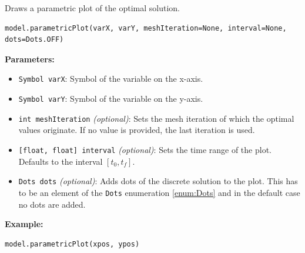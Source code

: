 \documentclass[12pt]{article}
\begin{document}
\begin{mdframed}[backgroundcolor=gray!10, roundcorner=10pt,
		linewidth=1pt]
	
	Draws a parametric plot of the optimal solution.
 
	\begin{lstlisting}
model.parametricPlot(varX, varY, meshIteration=None, interval=None, dots=Dots.OFF)
		\end{lstlisting}
	\label{parametricPlot}
	\textbf{Parameters:}
	\begin{itemize}
		\item \texttt{Symbol varX}: Symbol of the variable on the x-axis.
		
		\item \texttt{Symbol varY}: Symbol of the variable on the y-axis.
		
		\item \texttt{int meshIteration} \emph{(optional)}: Sets the mesh iteration of which the optimal values originate. If no value is provided, the last iteration is used.

		\item \texttt{[float, float] interval} \emph{(optional)}: Sets the time range of the plot. Defaults to the interval $[t_0, t_f]$.

		\item \texttt{Dots dots} \emph{(optional)}: Adds dots of the discrete solution to the plot. This has to be an element of the \texttt{Dots} enumeration \eqref{enum:Dots} and in the default case no dots are added.
	\end{itemize}
	
	\textbf{Example:}
\begin{lstlisting}
model.parametricPlot(xpos, ypos)   
\end{lstlisting}
\end{mdframed}
\end{document}
